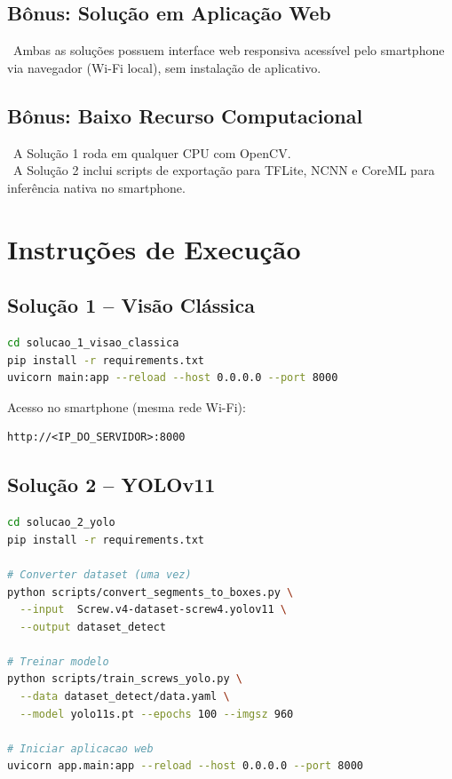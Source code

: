 \documentclass[12pt,a4paper]{article}
\begin{document}
\subsection{B\^onus: Solu\c{c}\~ao em Aplica\c{c}\~ao Web}

\checkmark\ Ambas as solu\c{c}\~oes possuem interface web responsiva acess\'ivel
pelo smartphone via navegador (Wi-Fi local), sem instala\c{c}\~ao de aplicativo.

\subsection{B\^onus: Baixo Recurso Computacional}

\checkmark\ A Solu\c{c}\~ao 1 roda em qualquer CPU com OpenCV. \\
\checkmark\ A Solu\c{c}\~ao 2 inclui scripts de exporta\c{c}\~ao para TFLite, NCNN e
CoreML para infer\^encia nativa no smartphone.

\section{Instru\c{c}\~oes de Execu\c{c}\~ao}

\subsection{Solu\c{c}\~ao 1 -- Vis\~ao Cl\'assica}

\begin{lstlisting}[language=bash, caption={Iniciar a Solu\c{c}\~ao 1}]
cd solucao_1_visao_classica
pip install -r requirements.txt
uvicorn main:app --reload --host 0.0.0.0 --port 8000
\end{lstlisting}

Acesso no smartphone (mesma rede Wi-Fi):
\begin{verbatim}
http://<IP_DO_SERVIDOR>:8000
\end{verbatim}

\subsection{Solu\c{c}\~ao 2 -- YOLOv11}

\begin{lstlisting}[language=bash, caption={Prepara\c{c}\~ao e execu\c{c}\~ao da Solu\c{c}\~ao 2}]
cd solucao_2_yolo
pip install -r requirements.txt

# Converter dataset (uma vez)
python scripts/convert_segments_to_boxes.py \
  --input  Screw.v4-dataset-screw4.yolov11 \
  --output dataset_detect

# Treinar modelo
python scripts/train_screws_yolo.py \
  --data dataset_detect/data.yaml \
  --model yolo11s.pt --epochs 100 --imgsz 960

# Iniciar aplicacao web
uvicorn app.main:app --reload --host 0.0.0.0 --port 8000
\end{lstlisting}
\end{document}
